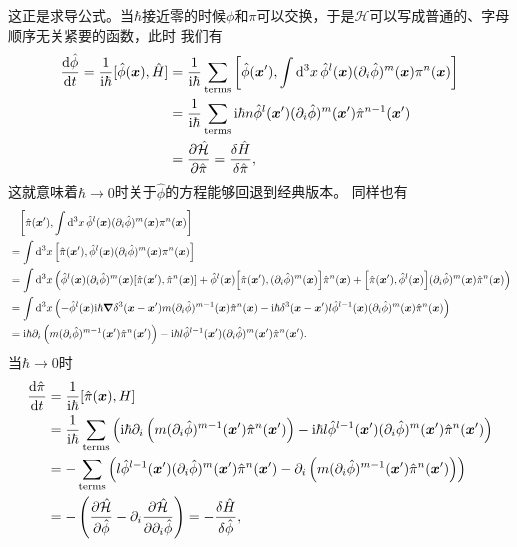 \documentclass[UTF8, a4paper]{ctexart}
\newcommand*{\ii}{\mathrm{i}}
\begin{document}
这正是求导公式。当$\hbar$接近零的时候$\phi$和$\pi$可以交换，于是$\mathcal{H}$可以写成普通的、字母顺序无关紧要的函数，此时
我们有
\[
    \begin{aligned}
        \dv{\hat{\phi}}{t} = \frac{1}{\ii \hbar} [\hat{\phi}(\vb*{x}), \hat{H}] &= \frac{1}{\ii \hbar} \sum_\text{terms} \comm{\hat{\phi}(\vb*{x}')}{\int \dd[3]{x} \hat{\phi}^l(\vb*{x}) (\partial_i \hat{\phi})^m (\vb*{x}) \pi^n(\vb*{x})} \\
        &= \frac{1}{\ii \hbar} \sum_\text{terms} \ii \hbar n \hat{\phi}^l (\vb*{x}') (\partial_i \hat{\phi})^m (\vb*{x}') \hat{\pi}^{n-1}(\vb*{x}') \\
        &= \pdv{\hat{\mathcal{H}}}{\hat{\pi}} = \fdv{\hat{H}}{\hat{\pi}},
    \end{aligned}
\]
这就意味着$\hbar\to 0$时关于$\hat{\phi}$的方程能够回退到经典版本。
同样也有
\[
    \begin{aligned}
        &\quad \comm{\hat{\pi}(\vb*{x}')}{\int \dd[3]{x} \hat{\phi}^l(\vb*{x}) (\partial_i \hat{\phi})^m (\vb*{x}) \pi^n(\vb*{x})} \\ 
        &= \int \dd[3]{x} \comm{\hat{\pi}(\vb*{x}')}{\hat{\phi}^l(\vb*{x}) (\partial_i \hat{\phi})^m (\vb*{x}) \pi^n(\vb*{x})} \\
        &= \int \dd[3]{x} \left( \hat{\phi}^l (\vb*{x}) (\partial_i \hat{\phi} )^m (\vb*{x}) \comm{\hat{\pi}(\vb*{x}')}{\hat{\pi}^n(\vb*{x})} + \hat{\phi}^l (\vb*{x}) \comm{\hat{\pi}(\vb*{x}')}{(\partial_i \hat{\phi})^m (\vb*{x})} \hat{\pi}^n (\vb*{x}) + \comm{\hat{\pi}(\vb*{x}')}{\hat{\phi}^l (\vb*{x})} (\partial_i \hat{\phi})^m (\vb*{x}) \hat{\pi}^n (\vb*{x}) \right) \\
        &= \int \dd[3]{x} \left( - \hat{\phi}^l (\vb*{x}) \ii \hbar \grad{\delta^3 (\vb*{x} - \vb*{x}')} m (\partial_i \hat{\phi})^{m-1} (\vb*{x}) \hat{\pi}^n (\vb*{x}) - \ii \hbar \delta^3(\vb*{x} - \vb*{x}') l \hat{\phi}^{l-1} (\vb*{x}) (\partial_i \hat{\phi})^m (\vb*{x}) \hat{\pi}^n (\vb*{x}) \right) \\
        &= \ii \hbar \partial_i \left(m (\partial_i \hat{\phi})^{m-1} (\vb*{x}') \hat{\pi}^n (\vb*{x}')\right) - \ii \hbar l \hat{\phi}^{l-1} (\vb*{x}') (\partial_i \hat{\phi})^m (\vb*{x}') \hat{\pi}^n (\vb*{x}').
    \end{aligned}
\]
当$\hbar \to 0$时
\[
    \begin{aligned}
        \dv{\hat{\pi}}{t} &= \frac{1}{\ii \hbar} [\hat{\pi}(\vb*{x}), H] \\
        &= \frac{1}{\ii \hbar} \sum_\text{terms} \left(\ii \hbar \partial_i \left(m (\partial_i \hat{\phi})^{m-1} (\vb*{x}') \hat{\pi}^n (\vb*{x}')\right) - \ii \hbar l \hat{\phi}^{l-1} (\vb*{x}') (\partial_i \hat{\phi})^m (\vb*{x}') \hat{\pi}^n (\vb*{x}')\right) \\
        &= - \sum_\text{terms} \left(l \hat{\phi}^{l-1} (\vb*{x}') (\partial_i \hat{\phi})^m (\vb*{x}') \hat{\pi}^n (\vb*{x}') - \partial_i \left(m (\partial_i \hat{\phi})^{m-1} (\vb*{x}') \hat{\pi}^n (\vb*{x}')\right) \right) \\
        &= - \left( \pdv{\hat{\mathcal{H}}}{\hat{\phi}} - \partial_i \pdv{\hat{\mathcal{H}}}{\partial_i \hat{\phi}} \right) = - \fdv{\hat{H}}{\hat{\phi}},
    \end{aligned}
\]
\end{document}
